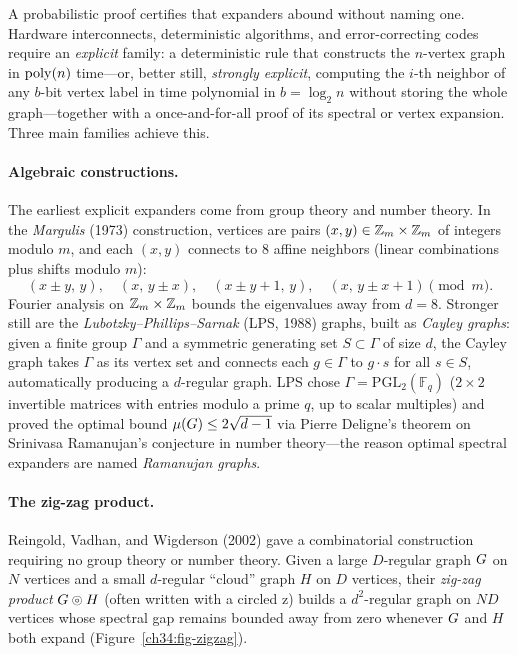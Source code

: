A probabilistic proof certifies that expanders abound without naming one. Hardware interconnects, deterministic algorithms, and error-correcting codes require an \emph{explicit} family: a deterministic rule that constructs the $n$-vertex graph in $\operatorname{poly}(n)$ time---or, better still, \emph{strongly explicit}, computing the $i$-th neighbor of any $b$-bit vertex label in time polynomial in $b=\log_2 n$ without storing the whole graph---together with a once-and-for-all proof of its spectral or vertex expansion. Three main families achieve this.

\paragraph{Algebraic constructions.} The earliest explicit expanders come from group theory and number theory. In the \emph{Margulis} (1973) construction, vertices are pairs $(x,y)\in\mathbb{Z}_m\times\mathbb{Z}_m$ of integers modulo $m$, and each $(x,y)$ connects to $8$ affine neighbors (linear combinations plus shifts modulo $m$):
\[
  (x\pm y,\,y),\quad (x,\,y\pm x),\quad (x\pm y+1,\,y),\quad (x,\,y\pm x+1) \pmod{m}.
\]
Fourier analysis on $\mathbb{Z}_m\times\mathbb{Z}_m$ bounds the eigenvalues away from $d=8$. Stronger still are the \emph{Lubotzky--Phillips--Sarnak} (LPS, 1988) graphs, built as \emph{Cayley graphs}: given a finite group $\Gamma$ and a symmetric generating set $S\subset\Gamma$ of size $d$, the Cayley graph takes $\Gamma$ as its vertex set and connects each $g\in\Gamma$ to $g\cdot s$ for all $s\in S$, automatically producing a $d$-regular graph. LPS chose $\Gamma = \mathrm{PGL}_2(\mathbb{F}_q)$ ($2\times 2$ invertible matrices with entries modulo a prime $q$, up to scalar multiples) and proved the optimal bound $\mu(G)\le 2\sqrt{d-1}$ via Pierre Deligne's theorem on Srinivasa Ramanujan's conjecture in number theory---the reason optimal spectral expanders are named \emph{Ramanujan graphs}.

\paragraph{The zig-zag product.} Reingold, Vadhan, and Wigderson (2002) gave a combinatorial construction requiring no group theory or number theory. Given a large $D$-regular graph $G$ on $N$ vertices and a small $d$-regular ``cloud'' graph $H$ on $D$ vertices, their \emph{zig-zag product} $G\mathbin{\circledcirc} H$ (often written with a circled $\mathrm{z}$) builds a $d^2$-regular graph on $ND$ vertices whose spectral gap remains bounded away from zero whenever $G$ and $H$ both expand (Figure~\ref{ch34:fig-zigzag}).

